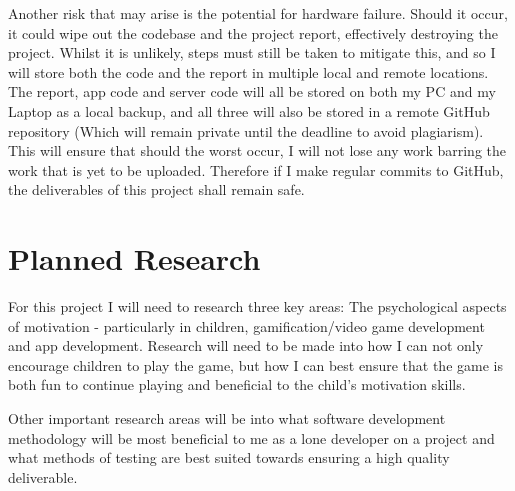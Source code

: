 Another risk that may arise is the potential for hardware failure. 
Should it occur, it could wipe out the codebase and the project report, effectively destroying the project. 
Whilst it is unlikely, steps must still be taken to mitigate this, and so I will store both the code and the report in multiple local and remote locations.
The report, app code and server code will all be stored on both my PC and my Laptop as a local backup, and all three will also be stored in a remote GitHub repository (Which will remain private until the deadline to avoid plagiarism).
This will ensure that should the worst occur, I will not lose any work barring the work that is yet to be uploaded.
Therefore if I make regular commits to GitHub, the deliverables of this project shall remain safe. 

\section{Planned Research}
For this project I will need to research three key areas: The psychological aspects of motivation - particularly in children, gamification/video game development and app development.
Research will need to be made into how I can not only encourage children to play the game, but how I can best ensure that the game is both fun to continue playing and beneficial to the child's motivation skills.

Other important research areas will be into what software development methodology will be most beneficial to me as a lone developer on a project and what methods of testing are best suited towards ensuring a high quality deliverable.